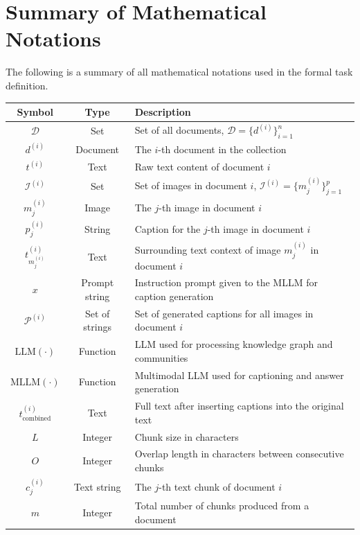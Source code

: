 \section{Summary of Mathematical Notations}
\label{appendix:mathnotations}

The following is a summary of all mathematical notations used in the formal task definition.

\begin{tabularx}{\textwidth}{@{} c c X @{}}
    \toprule
    \textbf{Symbol} & \textbf{Type} & \textbf{Description} \\
    \midrule
    \endhead
    $\mathcal{D}$ & Set & Set of all documents, $\mathcal{D} = \{ d^{(i)} \}_{i=1}^n$ \\
    $d^{(i)}$ & Document & The $i$-th document in the collection \\
    $t^{(i)}$ & Text & Raw text content of document $i$ \\
    $\mathcal{I}^{(i)}$ & Set & Set of images in document $i$, $\mathcal{I}^{(i)} = \{ m_j^{(i)} \}_{j=1}^{p}$ \\
    $m_j^{(i)}$ & Image & The $j$-th image in document $i$ \\
    $p_j^{(i)}$ & String & Caption for the $j$-th image in document $i$ \\
    $t^{(i)}_{m_j^{(i)}}$ & Text & Surrounding text context of image $m_j^{(i)}$ in document $i$ \\
    $x$ & Prompt string & Instruction prompt given to the MLLM for caption generation \\
    $\mathcal{P}^{(i)}$ & Set of strings & Set of generated captions for all images in document $i$ \\
    $\text{LLM}(\cdot)$ & Function & LLM used for processing knowledge graph and communities \\
    $\text{MLLM}(\cdot)$ & Function & Multimodal LLM used for captioning and answer generation \\
    $t_{\text{combined}}^{(i)}$ & Text & Full text after inserting captions into the original text \\
    $L$ & Integer & Chunk size in characters \\
    $O$ & Integer & Overlap length in characters between consecutive chunks \\
    $c_j^{(i)}$ & Text string & The $j$-th text chunk of document $i$ \\
    $m$ & Integer & Total number of chunks produced from a document \\

\end{tabularx}

